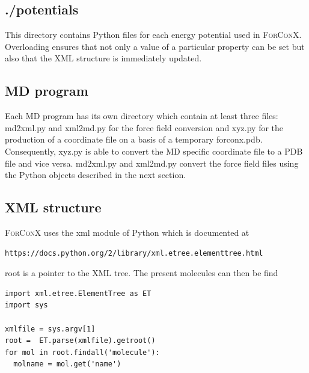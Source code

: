 \documentclass[12pt]{article}
\begin{document}
\subsection{./potentials}
This directory contains Python files for each energy potential used in \textsc{ForConX}. 
Overloading ensures that not only a value of a particular property can be set but also that the XML structure is immediately updated.

\subsection{MD program}
Each MD program has its own directory which contain at least three files:
md2xml.py and xml2md.py for the force field conversion and xyz.py for the production of a coordinate file on a basis of a temporary forconx.pdb. Consequently,
xyz.py is able to convert the MD specific coordinate file to a PDB file and vice versa. md2xml.py and xml2md.py convert the force field files using the Python objects
described in the next section.

\subsection{XML structure}
\textsc{ForConX} uses the xml module of Python which is documented at 
\begin{lstlisting}[basicstyle=\linespread{1}\ttfamily\small]
https://docs.python.org/2/library/xml.etree.elementtree.html
\end{lstlisting}

{\noindent}root is a pointer to the XML tree. The present molecules  can then be find 
\begin{lstlisting}[basicstyle=\linespread{1}\ttfamily\small]
import xml.etree.ElementTree as ET
import sys

xmlfile = sys.argv[1]
root =  ET.parse(xmlfile).getroot()
for mol in root.findall('molecule'):
  molname = mol.get('name')
\end{lstlisting}
\end{document}
